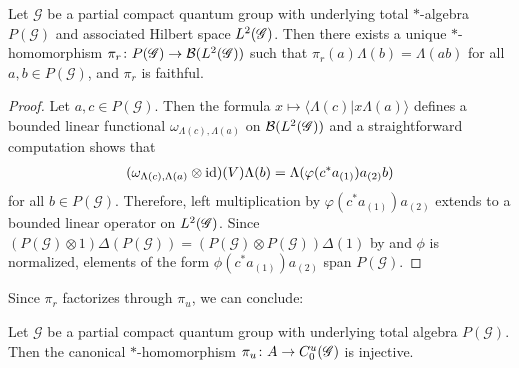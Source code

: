 \begin{Prop} \label{prop:gns} Let $\mathscr{G}$ be a partial compact
  quantum group with underlying total $*$-algebra $P(\mathscr{G})$ and
  associated Hilbert space $L^{2}(\mathscr{G})$. Then there exists a unique
  $*$-homomorphism $\pi_{r}\colon P(\mathscr{G}) \to {\cal B}(L^{2}(\mathscr{G}))$
  such that $\pi_{r}(a)\Lambda(b)=\Lambda(ab)$ for all $a,b\in
  P(\mathscr{G})$, and $\pi_{r}$ is faithful.
\end{Prop}
\begin{proof} 
  Let $a,c \in P(\mathscr{G})$. Then the formula $x \mapsto \langle
\Lambda(c) | x\Lambda(a)\rangle$ defines a bounded linear functional
  $\omega_{\Lambda(c),\Lambda(a)}$ on ${\cal B}(L^{2}(\mathscr{G}))$ and a
  straightforward computation shows that
  \begin{align} \label{eq:vn-slice}
    (\omega_{\Lambda(c),\Lambda(a)}\otimes \operatorname{id})(V)\Lambda(b) =
    \Lambda(\varphi(c^*a_{(1)})a_{(2)}b)
  \end{align}
  for all $b\in P(\mathscr{G})$. Therefore, left multiplication by
  $\varphi(c^*a_{(1)})a_{(2)}$ extends to a bounded linear operator on
  $L^{2}(\mathscr{G})$. 
 Since $(P(\mathscr{G})\otimes 1)\Delta(P(\mathscr{G})) = (P(\mathscr{G})\otimes
  P(\mathscr{G}))\Delta(1)$ by  \cite[Proposition 1.30]{DCT1} and $\phi$ is
  normalized,  elements of the form $\phi(c^{*}a_{(1)})a_{(2)}$ span
  $P(\mathscr{G})$. 
\end{proof}
Since $\pi_{r}$ factorizes through $\pi_{u}$, we can conclude:
\begin{Cor}
  Let $\mathscr{G}$ be a partial compact quantum group with underlying
  total algebra $P(\mathscr{G})$. Then the
  canonical $*$-homomorphism $\pi_{u} \colon A \to C^{u}_{0}(\mathscr{G})$ is injective.
\end{Cor}

